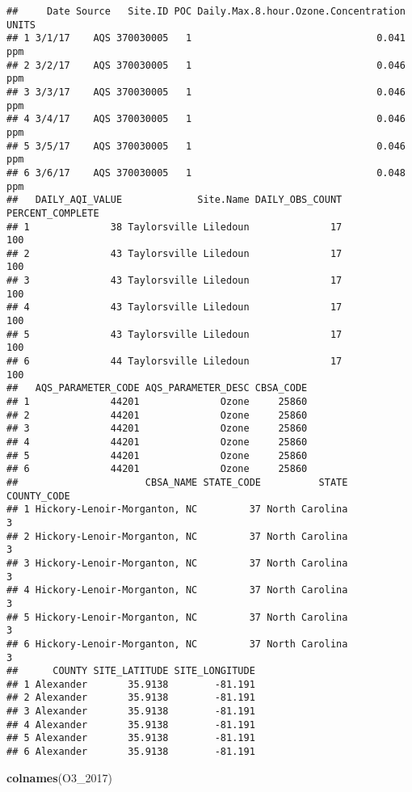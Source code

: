 \documentclass[]{article}
\newenvironment{Shaded}{\begin{snugshade}}{\end{snugshade}}
\newcommand{\KeywordTok}[1]{\textcolor[rgb]{0.13,0.29,0.53}{\textbf{#1}}}
\newcommand{\DecValTok}[1]{\textcolor[rgb]{0.00,0.00,0.81}{#1}}
\newcommand{\NormalTok}[1]{#1}
\begin{document}
\begin{verbatim}
##     Date Source   Site.ID POC Daily.Max.8.hour.Ozone.Concentration UNITS
## 1 3/1/17    AQS 370030005   1                                0.041   ppm
## 2 3/2/17    AQS 370030005   1                                0.046   ppm
## 3 3/3/17    AQS 370030005   1                                0.046   ppm
## 4 3/4/17    AQS 370030005   1                                0.046   ppm
## 5 3/5/17    AQS 370030005   1                                0.046   ppm
## 6 3/6/17    AQS 370030005   1                                0.048   ppm
##   DAILY_AQI_VALUE             Site.Name DAILY_OBS_COUNT PERCENT_COMPLETE
## 1              38 Taylorsville Liledoun              17              100
## 2              43 Taylorsville Liledoun              17              100
## 3              43 Taylorsville Liledoun              17              100
## 4              43 Taylorsville Liledoun              17              100
## 5              43 Taylorsville Liledoun              17              100
## 6              44 Taylorsville Liledoun              17              100
##   AQS_PARAMETER_CODE AQS_PARAMETER_DESC CBSA_CODE
## 1              44201              Ozone     25860
## 2              44201              Ozone     25860
## 3              44201              Ozone     25860
## 4              44201              Ozone     25860
## 5              44201              Ozone     25860
## 6              44201              Ozone     25860
##                      CBSA_NAME STATE_CODE          STATE COUNTY_CODE
## 1 Hickory-Lenoir-Morganton, NC         37 North Carolina           3
## 2 Hickory-Lenoir-Morganton, NC         37 North Carolina           3
## 3 Hickory-Lenoir-Morganton, NC         37 North Carolina           3
## 4 Hickory-Lenoir-Morganton, NC         37 North Carolina           3
## 5 Hickory-Lenoir-Morganton, NC         37 North Carolina           3
## 6 Hickory-Lenoir-Morganton, NC         37 North Carolina           3
##      COUNTY SITE_LATITUDE SITE_LONGITUDE
## 1 Alexander       35.9138        -81.191
## 2 Alexander       35.9138        -81.191
## 3 Alexander       35.9138        -81.191
## 4 Alexander       35.9138        -81.191
## 5 Alexander       35.9138        -81.191
## 6 Alexander       35.9138        -81.191
\end{verbatim}

\begin{Shaded}
\begin{Highlighting}[]
\KeywordTok{colnames}\NormalTok{(O3_}\DecValTok{2017}\NormalTok{)}
\end{Highlighting}
\end{Shaded}
\end{document}

